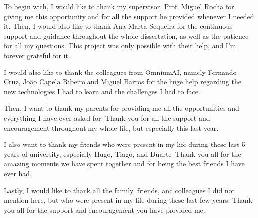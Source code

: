 \acknowledgements

To begin with, I would like to thank my supervisor, Prof. Miguel Rocha for giving me this opportunity and for all the support he provided whenever I needed it. Then, I would also like to thank Ana Marta Sequeira for the continuous support and guidance throughout the whole dissertation, as well as the patience for all my questions. This project was only possible with their help, and I'm forever grateful for it.

I would also like to thank the colleagues from OmniumAI, namely Fernando Cruz, João Capela Ribeiro and Miguel Barros for the huge help regarding the new technologies I had to learn and the challenges I had to face.

Then, I want to thank my parents for providing me all the opportunities and everything I have ever asked for. Thank you for all the support and encouragement throughout my whole life, but especially this last year.

I also want to thank my friends who were present in my life during these last 5 years of university, especially Hugo, Tiago, and Duarte. Thank you all for the amazing moments we have spent together and for being the best friends I have ever had.

Lastly, I would like to thank all the family, friends, and colleagues I did not mention here, but who were present in my life during these last few years. Thank you all for the support and encouragement you have provided me.